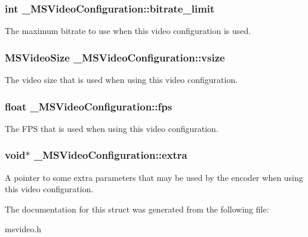 \subsubsection[{bitrate\-\_\-limit}]{\setlength{\rightskip}{0pt plus 5cm}int \-\_\-\-M\-S\-Video\-Configuration\-::bitrate\-\_\-limit}\label{struct__MSVideoConfiguration_abcd05a6fdc2a63e726f2c4eb33e726dd}
The maximum bitrate to use when this video configuration is used. 
\subsubsection[{vsize}]{\setlength{\rightskip}{0pt plus 5cm}M\-S\-Video\-Size \-\_\-\-M\-S\-Video\-Configuration\-::vsize}\label{struct__MSVideoConfiguration_ab3d922aca4559e0eae2f2e9d9bfa86a3}
The video size that is used when using this video configuration. 
\subsubsection[{fps}]{\setlength{\rightskip}{0pt plus 5cm}float \-\_\-\-M\-S\-Video\-Configuration\-::fps}\label{struct__MSVideoConfiguration_a764c2a56149594003c91c4a287030e1e}
The F\-P\-S that is used when using this video configuration. 
\subsubsection[{extra}]{\setlength{\rightskip}{0pt plus 5cm}void$\ast$ \-\_\-\-M\-S\-Video\-Configuration\-::extra}\label{struct__MSVideoConfiguration_af04997ce53f0b157036274284146d0da}
A pointer to some extra parameters that may be used by the encoder when using this video configuration. 

The documentation for this struct was generated from the following file\-:\begin{DoxyCompactItemize}
\item 
msvideo.\-h\end{DoxyCompactItemize}
